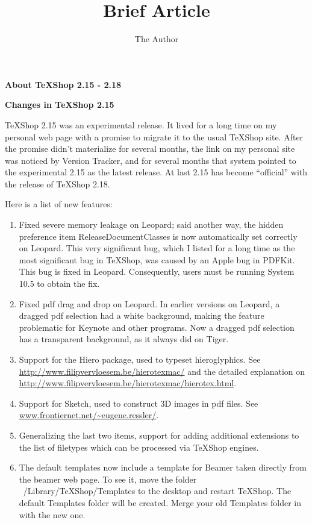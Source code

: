 \documentclass[11pt, oneside]{amsart}
\title{Brief Article}
\author{The Author}
\begin{document}
{\bf \Large About TeXShop 2.15 - 2.18}

\vspace{.2in}
{\bf  Changes in TeXShop 2.15}

TeXShop 2.15 was an experimental release. It lived for a long time on my personal web page with a promise to migrate it to the usual TeXShop site. After the promise didn't materialize for several months, the link on my personal site was noticed by Version Tracker, and for several months that system pointed to the experimental 2.15 as the latest release. At last 2.15 has become ``official'' with the release of TeXShop 2.18.

Here is a list of new features:

\begin{enumerate}
\item Fixed severe memory leakage on Leopard; said another way, the hidden preference item ReleaseDocumentClasses is now automatically set correctly on Leopard. This very significant bug, which I listed for a long time as the most significant bug in TeXShop, was caused by an Apple bug in PDFKit. This bug is fixed in Leopard. Consequently, users must be running System 10.5 to obtain the fix.
\item Fixed pdf drag and drop on Leopard. In earlier versions on Leopard, a dragged pdf selection had a white background, making the feature problematic for Keynote and other programs. Now a dragged pdf selection has a transparent background, as it always did on Tiger.
\item  Support for the Hiero package, used to typeset hieroglyphics. See \url{http://www.filipvervloesem.be/hierotexmac/} and
the detailed explanation on \url{http://www.filipvervloesem.be/hierotexmac/hierotex.html}.
\item Support for Sketch, used to construct 3D images in pdf files. See  \url{www.frontiernet.net/~eugene.ressler/}.
\item Generalizing the last two items, support for adding additional extensions to the list of filetypes which can be processed via TeXShop engines.
\item The default templates now include a template for Beamer taken directly from the beamer web page. To see it, move the folder ~/Library/TeXShop/Templates to the desktop and restart TeXShop. The default Templates folder will be created. Merge your old Templates folder in with the new one.
\end{enumerate}
\end{document}
